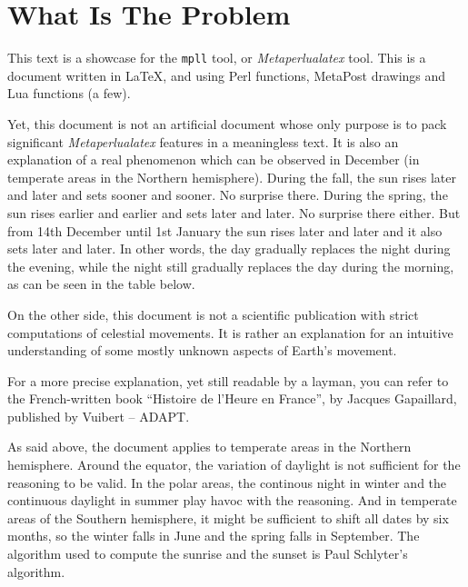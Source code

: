 \documentclass[a4paper]{article}
\newenvironment{texte}{\rmfamily}{}
\begin{document}
\begin{texte}


\section{What Is The Problem}

This text is a showcase for the \texttt{mpll} tool, or
\textit{Metaperlualatex} tool. This is a document written in \LaTeX,
and using Perl functions, MetaPost drawings
and Lua functions (a few).

Yet, this document is not an artificial document whose
only purpose is to pack significant \textit{Metaperlualatex} features in a
meaningless text. It is also an explanation 
of a real phenomenon which can be observed
in December (in temperate areas in the Northern hemisphere).
During the fall, the sun rises later and later
and sets sooner and sooner. No surprise there.
During the spring, the sun rises earlier and earlier
and sets later and later.
No surprise there either. But from
14th December until 1st January
the sun rises later and later and it also sets later 
and later. In other words, the day gradually replaces
the night during the evening, while the night
still gradually replaces the day during the morning,
as can be seen in the table below.

\vspace{2mm}
\vspace{2mm}

On the other side, this document is not a scientific publication
with strict computations of celestial movements.
It is rather an explanation for an intuitive
understanding of some mostly unknown aspects
of Earth's movement.

For a more precise explanation, yet still readable by a layman,
you can refer to the French-written book
``Histoire de l'Heure en France'', by Jacques Gapaillard, 
published by Vuibert -- ADAPT.

As said above, the document applies to temperate areas in
the Northern hemisphere. Around the equator, the variation 
of daylight is not sufficient for the reasoning to be valid.
In the polar areas, the continous night in winter and the continuous
daylight in summer play havoc with the reasoning. And in temperate
areas of the Southern hemisphere, it might be sufficient to
shift all dates by six months, so the winter falls in June and the
spring falls in September.
The algorithm used to compute the sunrise and the sunset is
Paul Schlyter's algorithm.


\end{texte}
\end{document}
